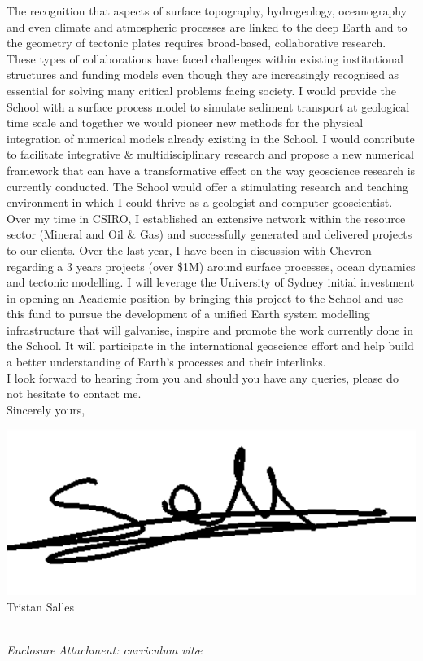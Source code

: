\documentclass[11pt]{article}
\begin{document}
The recognition that aspects of surface topography, hydrogeology, oceanography and even climate and atmospheric processes are linked to the deep Earth and to the geometry of tectonic plates requires broad-based, collaborative research. These types of collaborations have faced challenges within existing institutional structures and funding models even though they are increasingly recognised as essential for solving many critical problems facing society. I would provide the School with a surface process model to simulate sediment transport at geological time scale and together we would pioneer new methods for the physical integration of  numerical models already existing in the School. I would contribute to facilitate integrative \& multidisciplinary research and propose a new numerical framework that can have a transformative effect on the way geoscience research is currently conducted. The School would offer a stimulating research and teaching environment in which I could thrive as a geologist and computer geoscientist. \\

Over my time in CSIRO, I established an extensive network within the resource sector (Mineral and Oil \& Gas) and successfully generated and delivered projects to our clients. Over the last year, I have been in discussion with Chevron regarding a 3 years projects (over \$1M) around surface processes, ocean dynamics and tectonic modelling. I will leverage the University of Sydney initial investment in opening an Academic position by bringing this project to the School and use this fund to pursue the development of a unified Earth system modelling infrastructure that will galvanise, inspire and promote the work currently done in the School. It will participate in the international geoscience effort and help build a better understanding of Earth's processes and their interlinks. \\

I look forward to hearing from you and should you have any queries, please do not hesitate to contact me.
\\
Sincerely yours,\\[1em] %
%
\begin{minipage}[t]{1.\textwidth}
\raggedleft%
\includegraphics[scale=0.15]{signature}\\
{\small Tristan Salles}\\
\end{minipage}\\[0.25em]
%
{\slshape Enclosure}
{\vspace{-0.5cm} \small \slshape Attachment: curriculum vit\ae{}}
\end{document}
